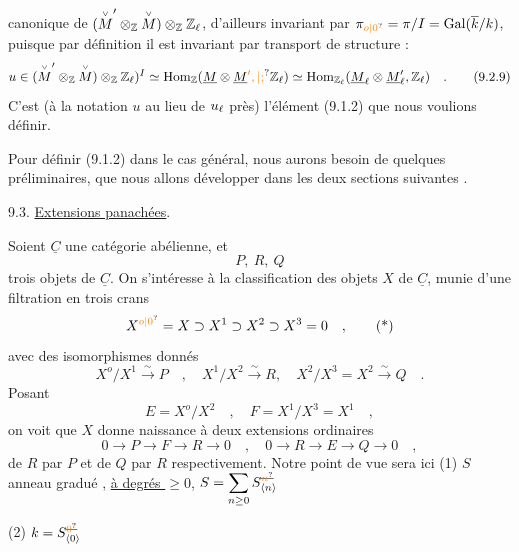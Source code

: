 canonique de $(\overset{\scriptscriptstyle\vee}{M}'\otimes_{\mathbb{Z}}\overset{\scriptscriptstyle\vee}{M})\otimes_{\mathbb{Z}}\mathbb{Z}_{\ell}$, d'ailleurs invariant par $\handwritten{\pi}_{\unsure{o|0}}=\handwritten{\pi}/I=\operatorname{Gal}(\overline{k}/k)$, puisque par définition il est invariant par transport de structure :
\[
u\handwritten{\in}(\overset{\handwritten{\scriptscriptstyle\vee}}{M}'\otimes_{\mathbb{Z}}\overset{\handwritten{\scriptscriptstyle\vee}}{M})\otimes_{\mathbb{Z}}\mathbb{Z}_{\handwritten{\ell}})^{I}\simeq\operatorname{Hom}_{\mathbb{Z}}(\underline{M}\otimes\underline{M}\unsure{',|;}\mathbb{Z}_{\handwritten{\ell}})\simeq\operatorname{Hom}_{\mathbb{Z}_{\handwritten{\ell}}}(\underline{M}_{\handwritten{\ell}}\otimes\underline{M}'_{\handwritten{\ell}},\mathbb{Z}_{\handwritten{\ell}})\quad .\tag*{(9.2.9)}
\]
C'est (à la notation $u$ au lieu de $u_{\ell}$ près) l'élément (9.1.2) que nous voulions définir.

Pour définir (9.1.2) dans le cas général, nous aurons besoin de quelques préliminaires, que nous allons développer dans les deux sections suivantes .

9.3. \uline{Extensions panachées}.

Soient $\underline{C}$ une catégorie abélienne, et
\[
P,\ R,\ Q\tag*{(9.3.1)}
\]
trois objets de $\underline C$. On s'intéresse à la classification des objets $X$ de $\underline C$, munie d'une filtration en trois crans
\[
X^{\unsure{o|0}}=X\handwritten{\supset}X^{1}\handwritten{\supset}X^{2}\handwritten{\supset}X^{3}=0\quad ,\tag*{(*)}
\]
avec des isomorphismes donnés
\[
X^{o}/X^{1}\xrightarrow{\sim}P\quad ,\quad X^{1}/X^{2}\xrightarrow{\sim}R,\quad X^{2}/X^{3}=X^{2}\xrightarrow{\sim}Q\quad .
\]
Posant
\[
E=X^{o}/X^{2}\quad ,\quad F=X^{1}/X^{3}=X^{1}\quad ,
\]
on voit que $X$ donne naissance à deux extensions ordinaires
\[
0\longrightarrow P\longrightarrow F\longrightarrow R\longrightarrow0\quad ,\quad 0\longrightarrow R\longrightarrow E\longrightarrow Q\longrightarrow0\quad ,\tag*{(9.3.2)}
\]
de $R$ par $P$ et de $Q$ par $R$ respectivement. Notre point de vue sera ici
(1) $S$ anneau gradué , \uline{à degrés $\geq0$}, $\displaystyle S=\sum_{n\geq0} S_{\inserted{n}}^{\deleted{\unsure{n}}}$


(2) $k=S_{\inserted{0}}^{\deleted{\unsure{0}}}$

